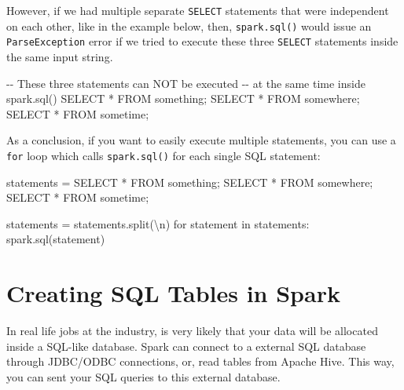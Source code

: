 \documentclass[
  11pt,
  letterpaper,
  DIV=11,
  numbers=noendperiod]{scrreprt}
\newenvironment{Shaded}{\begin{snugshade}}{\end{snugshade}}
\newcommand{\CharTok}[1]{\textcolor[rgb]{0.13,0.47,0.30}{#1}}
\newcommand{\CommentTok}[1]{\textcolor[rgb]{0.37,0.37,0.37}{#1}}
\newcommand{\ControlFlowTok}[1]{\textcolor[rgb]{0.00,0.23,0.31}{#1}}
\newcommand{\KeywordTok}[1]{\textcolor[rgb]{0.00,0.23,0.31}{#1}}
\newcommand{\NormalTok}[1]{\textcolor[rgb]{0.00,0.23,0.31}{#1}}
\newcommand{\OperatorTok}[1]{\textcolor[rgb]{0.37,0.37,0.37}{#1}}
\newcommand{\StringTok}[1]{\textcolor[rgb]{0.13,0.47,0.30}{#1}}
\begin{document}
However, if we had multiple separate \texttt{SELECT} statements that
were independent on each other, like in the example below, then,
\texttt{spark.sql()} would issue an \texttt{ParseException} error if we
tried to execute these three \texttt{SELECT} statements inside the same
input string.

\begin{Shaded}
\begin{Highlighting}[]
\CommentTok{{-}{-} These three statements can NOT be executed}
\CommentTok{{-}{-} at the same time inside spark.sql()}
\KeywordTok{SELECT} \OperatorTok{*} \KeywordTok{FROM}\NormalTok{ something;}
\KeywordTok{SELECT} \OperatorTok{*} \KeywordTok{FROM}\NormalTok{ somewhere;}
\KeywordTok{SELECT} \OperatorTok{*} \KeywordTok{FROM}\NormalTok{ sometime;}
\end{Highlighting}
\end{Shaded}

As a conclusion, if you want to easily execute multiple statements, you
can use a \texttt{for} loop which calls \texttt{spark.sql()} for each
single SQL statement:

\begin{Shaded}
\begin{Highlighting}[]
\NormalTok{statements }\OperatorTok{=} \StringTok{\textquotesingle{}\textquotesingle{}\textquotesingle{}SELECT * FROM something;}
\StringTok{SELECT * FROM somewhere;}
\StringTok{SELECT * FROM sometime;\textquotesingle{}\textquotesingle{}\textquotesingle{}}

\NormalTok{statements }\OperatorTok{=}\NormalTok{ statements.split(}\StringTok{\textquotesingle{}}\CharTok{\textbackslash{}n}\StringTok{\textquotesingle{}}\NormalTok{)}
\ControlFlowTok{for}\NormalTok{ statement }\KeywordTok{in}\NormalTok{ statements:}
\NormalTok{  spark.sql(statement)}
\end{Highlighting}
\end{Shaded}

\hypertarget{creating-sql-tables-in-spark}{%
\section{Creating SQL Tables in
Spark}\label{creating-sql-tables-in-spark}}

In real life jobs at the industry, is very likely that your data will be
allocated inside a SQL-like database. Spark can connect to a external
SQL database through JDBC/ODBC connections, or, read tables from Apache
Hive. This way, you can sent your SQL queries to this external database.
\end{document}

